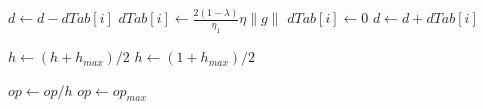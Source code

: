 

\begin{algorithm}[h!]
  \caption{Distance($d$, $dTab$, $g$, $\eta$, $\eta_1$, $\lambda$, $\epsilon$, $\newG{i}$)}
	\label{algo_dist}
	\begin{algorithmic}
		\STATE $d \leftarrow d-dTab[i]$
		\STATE $dTab[i] \leftarrow \frac{2(1-\lambda)}{\eta_1}\eta \|g\|$
		\ELSE
		\STATE $dTab[i] \leftarrow 0$
		\ENDIF
		\STATE $d \leftarrow d+dTab[i]$
	\end{algorithmic}
\end{algorithm}

\begin{algorithm}[h!]
	\caption{Heuristic($d$, $g$, $h$, $h_{max}$, $R$, $R_0$, $op$, $op_{max}$)}
	\label{algo_heuris}
	\begin{algorithmic}
		\IF{$d<\|g\|$}
		\STATE $h \leftarrow (h+h_{max})/2$	
		\ELSE
		\STATE $h \leftarrow (1+h_{max})/2$	
		\ENDIF
		
		\IF{$R<R_0$}
		\STATE $op \leftarrow op/h$	
		\ELSE
		\STATE $op \leftarrow op_{max}$	
		\ENDIF
	\end{algorithmic}
\end{algorithm}


